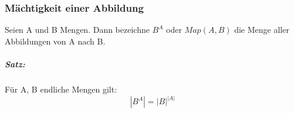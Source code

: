 \documentclass[a4paper,12pt, DIV12]{scrartcl}
\begin{document}
\begin{figure}
\hfill
{}\hfill
{}
\end{figure}

\subsubsection{Mächtigkeit einer Abbildung}
Seien A und B Mengen.
Dann bezeichne $B^A$ oder $Map(A,B)$ die Menge aller Abbildungen von A nach B.
\subparagraph*{Satz:}
Für A, B endliche Mengen gilt:
$$ |B^A| = {|B|}^{|A|} $$
\end{document}
